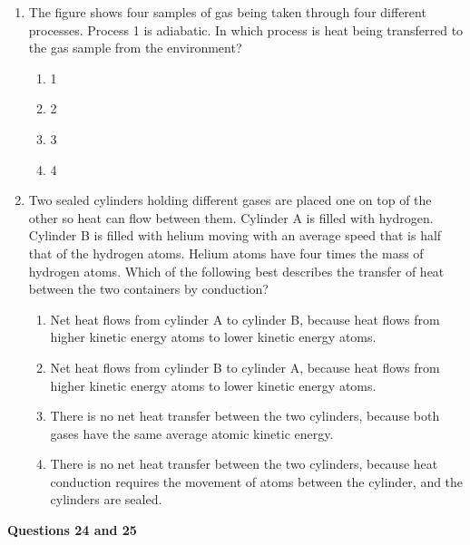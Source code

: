 \documentclass{../../oss-apphys}
\begin{document}
\begin{multicols}{2}
\begin{enumerate}[leftmargin=18pt,start=3]
  \item The figure shows four samples of gas being taken through four
    different processes. Process 1 is adiabatic. In which process is heat being
    transferred to the gas sample from the environment?
    \begin{center}
      \vspace{-.15in}
    \end{center}
    \begin{enumerate}[noitemsep,topsep=0pt,leftmargin=18pt,label=(\Alph*)]
    \item\num{1}
    \item\num{2}
    \item\num{3}
    \item\num{4}
    \end{enumerate}

    \columnbreak
    
  \item Two sealed cylinders holding different gases are placed one on top of
    the other so heat can flow between them. Cylinder A is filled with
    hydrogen. Cylinder B is filled with helium moving with an average speed
    that is half that of the hydrogen atoms. Helium atoms have four times the
    mass of hydrogen atoms. Which of the following best describes the transfer
    of heat between the two containers by conduction?
    \begin{enumerate}[noitemsep,topsep=0pt,leftmargin=18pt,label=(\Alph*)]
    \item Net heat flows from cylinder A to cylinder B, because heat flows from
      higher kinetic energy atoms to lower kinetic energy atoms.
    \item Net heat flows from cylinder B to cylinder A, because heat flows from
      higher kinetic energy atoms to lower kinetic energy atoms.
    \item There is no net heat transfer between the two cylinders, because both
      gases have the same average atomic kinetic energy.
    \item There is no net heat transfer between the two cylinders, because heat
      conduction requires the movement of atoms between the cylinder, and the
      cylinders are sealed.
    \end{enumerate}
  \end{enumerate}

  \columnbreak
  
  \textbf{Questions 24 and 25}


\end{multicols}
\end{document}

